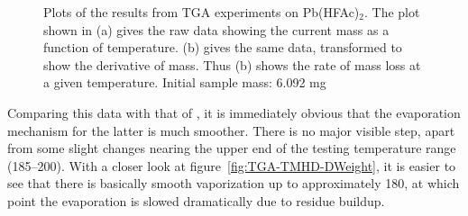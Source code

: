 \begin{figure}[tbp]
   \centering
	\hspace{1cm}
   \caption[TGA Results for Pb(HFAc)$_{2}$ Precursor]%
   		{Plots of the results from TGA experiments on Pb(HFAc)$_{2}$. The plot shown in (a) gives the raw %
		data showing the current mass as a function of temperature. (b) gives the same data, transformed %
		to show the derivative of mass. Thus (b) shows the rate of mass loss at a given temperature. Initial %
		sample mass: 6.092 mg}
   \label{fig:TGA-HFAc}
\end{figure}

Comparing this data with that of \TMHD{}, it is immediately obvious that the evaporation mechanism for the latter is much smoother. There is no major visible step, apart from some slight changes nearing the upper end of the testing temperature range (185--200\degC{}). With a closer look at figure~\vref{fig:TGA-TMHD-DWeight}, it is easier to see that there is basically smooth vaporization up to approximately 180\degC{}, at which point the evaporation is slowed dramatically due to residue buildup. 

